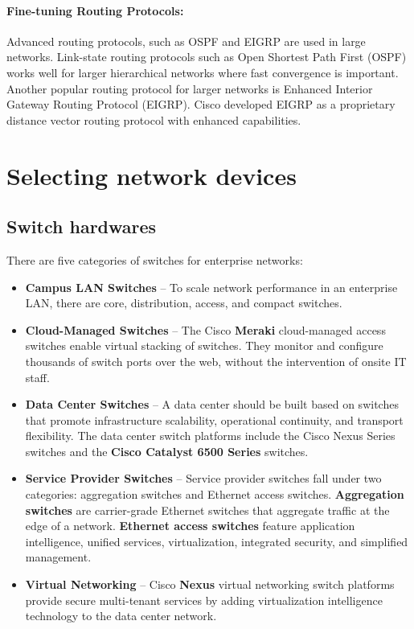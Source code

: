 \paragraph{Fine-tuning Routing Protocols:} Advanced routing protocols, such as OSPF and EIGRP are used in large networks. Link-state routing protocols such as Open Shortest Path First (OSPF) works well for larger hierarchical networks where fast convergence is important. Another popular routing protocol for larger networks is Enhanced Interior Gateway Routing Protocol (EIGRP). Cisco developed EIGRP as a proprietary distance vector routing protocol with enhanced capabilities.

\section{Selecting network devices}
\subsection{Switch hardwares}
There are five categories of switches for enterprise networks:

\begin{itemize}
\item \textbf{Campus LAN Switches} -- To scale network performance in an enterprise LAN, there are core, distribution, access, and compact switches.
\item \textbf{Cloud-Managed Switches} -- The Cisco \textbf{Meraki} cloud-managed access switches enable virtual stacking of switches. They monitor and configure thousands of switch ports over the web, without the intervention of onsite IT staff.

\item \textbf{Data Center Switches} -- A data center should be built based on switches that promote infrastructure scalability, operational continuity, and transport flexibility. The data center switch platforms include the Cisco Nexus Series switches and the \textbf{Cisco Catalyst 6500 Series} switches.

\item \textbf{Service Provider Switches} -- Service provider switches fall under two categories: aggregation switches and Ethernet access switches. \textbf{Aggregation switches} are carrier-grade Ethernet switches that aggregate traffic at the edge of a network. \textbf{Ethernet access switches} feature application intelligence, unified services, virtualization, integrated security, and simplified management.

\item \textbf{Virtual Networking} -- Cisco \textbf{Nexus} virtual networking switch platforms provide secure multi-tenant services by adding virtualization intelligence technology to the data center network.
\end{itemize}

